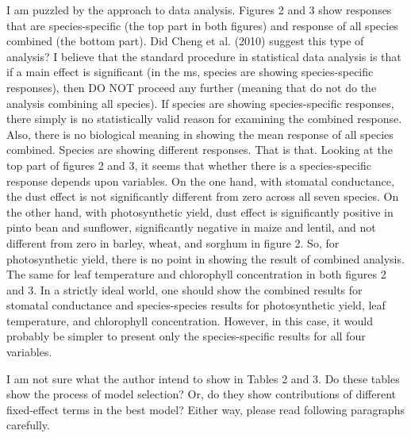 \documentclass[parskip=half]{scrartcl}
\begin{document}
I am puzzled by the approach to data analysis.
Figures 2 and 3 show responses that are species-specific (the top part in both figures) and response of all species combined (the bottom part). 
Did Cheng et al. (2010) suggest this type of analysis?
I believe that the standard procedure in statistical data analysis is that if a main effect is significant (in the ms, species are showing species-specific responses), then DO NOT proceed any further (meaning that do not do the analysis combining all species).
If species are showing species-specific responses, there simply is no statistically valid reason for examining the combined response.  Also, there is no biological meaning in showing the mean response of all species combined.  Species are showing different responses.  That is that.
Looking at the top part of figures 2 and 3, it seems that whether there is a species-specific response depends upon variables.
On the one hand, with stomatal conductance, the dust effect is not significantly different from zero across all seven species.
On the other hand, with photosynthetic yield, dust effect is significantly positive in pinto bean and sunflower, significantly negative in maize and lentil, and not different from zero in barley, wheat, and sorghum in figure 2. So, for photosynthetic yield, there is no point in showing the result of combined analysis.
The same for leaf temperature and chlorophyll concentration in both figures 2 and 3.
In a strictly ideal world, one should show the combined results for stomatal conductance and species-species results for photosynthetic yield, leaf temperature, and chlorophyll concentration.  However, in this case, it would probably be simpler to present only the species-specific results for all four variables.

I am not sure what the author intend to show in Tables 2 and 3. 
Do these tables show the process of model selection?
Or, do they show contributions of different fixed-effect terms in the best model?
Either way, please read following paragraphs carefully.
\end{document}
